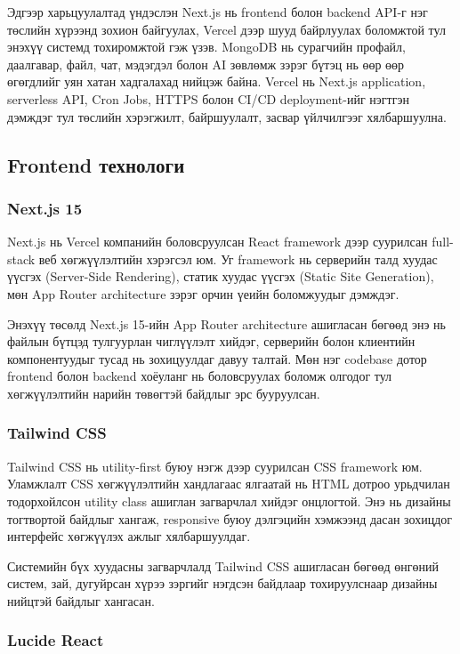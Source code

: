 Эдгээр харьцуулалтад үндэслэн Next.js нь frontend болон backend API-г нэг
төслийн хүрээнд зохион байгуулах, Vercel дээр шууд байрлуулах боломжтой
тул энэхүү системд тохиромжтой гэж үзэв. MongoDB нь сурагчийн профайл,
даалгавар, файл, чат, мэдэгдэл болон AI зөвлөмж зэрэг бүтэц нь өөр өөр
өгөгдлийг уян хатан хадгалахад нийцэж байна. Vercel нь Next.js application,
serverless API, Cron Jobs, HTTPS болон CI/CD deployment-ийг нэгтгэн
дэмждэг тул төслийн хэрэгжилт, байршуулалт, засвар үйлчилгээг хялбаршуулна.

\subsection{Frontend технологи}

\subsubsection{Next.js 15}

Next.js нь Vercel компанийн боловсруулсан React framework дээр суурилсан
full-stack веб хөгжүүлэлтийн хэрэгсэл юм. Уг framework нь серверийн талд
хуудас үүсгэх (Server-Side Rendering), статик хуудас үүсгэх (Static Site
Generation), мөн App Router architecture зэрэг орчин үеийн боломжуудыг
дэмждэг.

Энэхүү төсөлд Next.js 15-ийн App Router architecture ашигласан бөгөөд
энэ нь файлын бүтцэд тулгуурлан чиглүүлэлт хийдэг, серверийн болон
клиентийн компонентуудыг тусад нь зохицуулдаг давуу талтай. Мөн нэг
codebase дотор frontend болон backend хоёуланг нь боловсруулах боломж
олгодог тул хөгжүүлэлтийн нарийн төвөгтэй байдлыг эрс бууруулсан.

\subsubsection{Tailwind CSS}

Tailwind CSS нь utility-first буюу нэгж дээр суурилсан CSS framework юм.
Уламжлалт CSS хөгжүүлэлтийн хандлагаас ялгаатай нь HTML дотроо
урьдчилан тодорхойлсон utility class ашиглан загварчлал хийдэг онцлогтой.
Энэ нь дизайны тогтвортой байдлыг хангаж, responsive буюу дэлгэцийн
хэмжээнд дасан зохицдог интерфейс хөгжүүлэх ажлыг хялбаршуулдаг.

Системийн бүх хуудасны загварчлалд Tailwind CSS ашигласан бөгөөд
өнгөний систем, зай, дугуйрсан хүрээ зэргийг нэгдсэн байдлаар
тохируулснаар дизайны нийцтэй байдлыг хангасан.

\subsubsection{Lucide React}


